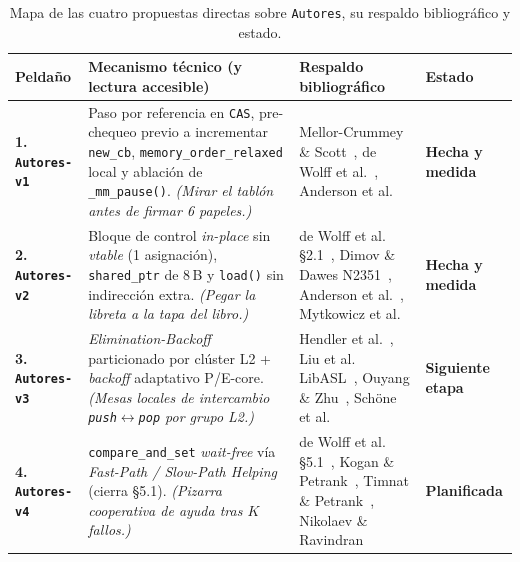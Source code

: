 \documentclass[11pt,a4paper]{article}
\begin{document}
\begin{table}[H]
\centering
\caption{Mapa de las cuatro propuestas directas sobre \texttt{Autores}, su respaldo bibliográfico y estado.}
\label{tab:cuatro_propuestas}
\footnotesize
\begin{tabularx}{\linewidth}{@{}l >{\raggedright\arraybackslash}X >{\raggedright\arraybackslash}p{4.5cm} l@{}}
\toprule
\textbf{Peldaño} & \textbf{Mecanismo técnico (y lectura accesible)} & \textbf{Respaldo bibliográfico} & \textbf{Estado} \\
\midrule
\textbf{1. \texttt{Autores-v1}} & Paso por referencia en \texttt{CAS}, pre-chequeo previo a incrementar \texttt{new\_cb}, \texttt{memory\_order\_relaxed} local y ablación de \texttt{\_mm\_pause()}. \emph{(Mirar el tablón antes de firmar 6 papeles.)} & Mellor-Crummey \& Scott~\cite{mellorcrummey1991mcs}, de Wolff et al.~\cite{dewolff2024waitfree}, Anderson et al.~\cite{anderson2022turning} & \textcolor{ok}{\textbf{Hecha y medida}} \\
\textbf{2. \texttt{Autores-v2}} & Bloque de control \emph{in-place} sin \emph{vtable} (1 asignación), \texttt{shared\_ptr} de 8\,B y \texttt{load()} sin indirección extra. \emph{(Pegar la libreta a la tapa del libro.)} & de Wolff et al. \S 2.1~\cite{dewolff2024waitfree}, Dimov \& Dawes N2351~\cite{dimov2007n2351}, Anderson et al.~\cite{anderson2022turning}, Mytkowicz et al.~\cite{mytkowicz2009wrongdata} & \textcolor{ok}{\textbf{Hecha y medida}} \\
\textbf{3. \texttt{Autores-v3}} & \emph{Elimination-Backoff} particionado por clúster L2 + \emph{backoff} adaptativo P/E-core. \emph{(Mesas locales de intercambio \texttt{push}$\leftrightarrow$\texttt{pop} por grupo L2.)} & Hendler et al.~\cite{hendler2004elimination}, Liu et al. LibASL~\cite{liu2022libasl}, Ouyang \& Zhu~\cite{ouyang2022coreaware}, Schöne et al.~\cite{schone2024alderlake} & \textcolor{acento}{\textbf{Siguiente etapa}} \\
\textbf{4. \texttt{Autores-v4}} & \texttt{compare\_and\_set} \emph{wait-free} vía \emph{Fast-Path / Slow-Path Helping} (cierra \S 5.1). \emph{(Pizarra cooperativa de ayuda tras $K$ fallos.)} & de Wolff et al. \S 5.1~\cite{dewolff2024waitfree}, Kogan \& Petrank~\cite{kogan2012methodology}, Timnat \& Petrank~\cite{timnat2014simulation}, Nikolaev \& Ravindran~\cite{nikolaev2024crystalline} & \textcolor{gris}{\textbf{Planificada}} \\
\bottomrule
\end{tabularx}
\end{table}
\end{document}
